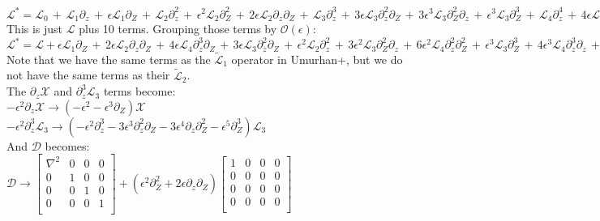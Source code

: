 \documentclass[letterpaper,12pt]{article}
\begin{document}
$\mathcal{L^*} = \mathcal{L}_0 \, + \, \mathcal{L}_1\partial_z \,+ \, \epsilon\mathcal{L}_1 \partial_Z \, + \, \mathcal{L}_2\partial_z^2 \, + \, \epsilon^2\mathcal{L}_2\partial_Z^2 \, + \, 2\epsilon\mathcal{L}_2\partial_z\partial_Z \, + \, \mathcal{L}_3\partial_z^3 \, +\, 3\epsilon \mathcal{L}_3 \partial_z^2 \partial_Z \,+\, 3 \epsilon^3\mathcal{L}_3\partial_Z^2\partial_z \,+\, \epsilon^3\mathcal{L}_3\partial_Z^3 \, + \, \mathcal{L}_4\partial_z^4 \, + \, 4 \epsilon \mathcal{L}_4 \partial_z^3 \partial_Z \, + \, 6 \epsilon^2\mathcal{L}_4 \partial_z^2 \partial_Z^2 \, + \, 4 \epsilon^3 \mathcal{L}_4 \partial_Z^3\partial_z \, + \, \epsilon^4\mathcal{L}_4\partial_Z^4$ \\

This is just $\mathcal{L}$ plus 10 terms. Grouping those terms by $\mathcal{O}(\epsilon)$: \\

$\mathcal{L^*} = \mathcal{L} + \epsilon\mathcal{L}_1\partial_Z \, + \, 2\epsilon\mathcal{L}_2\partial_z\partial_Z \, + \, 4 \epsilon\mathcal{L}_4\partial_z^3 \partial_Z \, + \, 3\epsilon\mathcal{L}_3\partial_z^2\partial_Z \, + \, \epsilon^2\mathcal{L}_2\partial_z^2 \, + \, 3\epsilon^2\mathcal{L}_3\partial_Z^2\partial_z \, + \, 6\epsilon^2\mathcal{L}_4 \partial_z^2 \partial_Z^2 \, + \, \epsilon^3\mathcal{L}_3\partial_Z^3 \, + \, 4 \epsilon^3\mathcal{L}_4\partial_z^3 \partial_z \, + \, \epsilon^4\mathcal{L}_4\partial_Z^4 $ \\

Note that we have the same terms as the $\widetilde{\mathcal{L}}_1$ operator in Umurhan+, but we do not have the same terms as their $\widetilde{\mathcal{L}}_2$. \\

The $\partial_z\mathcal{X}$ and $\partial_z^3\mathcal{L}_3$ terms become: \\

$-\epsilon^2\partial_z\mathcal{X} \to \left(-\epsilon^2 - \epsilon^3\partial_Z\right)\mathcal{X}$ \\

$-\epsilon^2\partial_z^3\mathcal{L}_3 \to \left(-\epsilon^2\partial_z^3 - 3\epsilon^3\partial_z^2\partial_Z - 3\epsilon^4\partial_z\partial_Z^2 - \epsilon^5\partial_Z^3\right)\mathcal{L}_3$ \\

And $\mathcal{D}$ becomes: \\

$\mathcal{D} \to \left[\begin{matrix}
\nabla^2 & 0 & 0 & 0 \\
0 & 1& 0 & 0 \\
0 & 0 & 1 & 0\\
0 & 0 & 0 & 1 \\
\end{matrix}\right] + \left(\epsilon^2\partial_Z^2 + 2\epsilon\partial_z\partial_Z\right)\left[\begin{matrix}
1 & 0 & 0 & 0 \\
0 & 0 & 0 & 0 \\
0 & 0 & 0 & 0 \\
0 & 0 & 0 & 0 \\ \end{matrix}\right]$ \\
\end{document}
